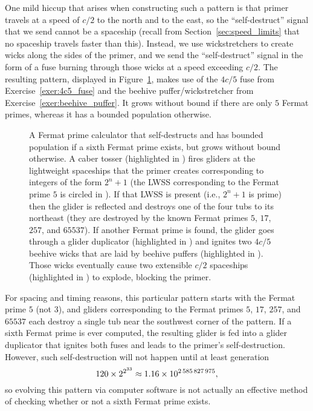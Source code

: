 One mild hiccup that arises when constructing such a pattern is that primer travels at a speed of $c/2$ to the north and to the east, so the ``self-destruct'' signal that we send cannot be a spaceship (recall from Section~\ref{sec:speed_limits} that no spaceship travels faster than this). Instead, we use wickstretchers to create wicks along the sides of the primer, and we send the ``self-destruct'' signal in the form of a fuse burning through those wicks at a speed exceeding $c/2$. The resulting pattern, displayed in Figure~\ref{fig:fermat_primer}, makes use of the $4c/5$ fuse from Exercise~\ref{exer:4c5_fuse} and the beehive puffer/wickstretcher from Exercise~\ref{exer:beehive_puffer}. It grows without bound if there are only $5$ Fermat primes, whereas it has a bounded population otherwise.

\begin{figure}[!htbp]
	\centering
	\caption{A Fermat prime calculator that self-destructs and has bounded population if a sixth Fermat prime exists, but grows without bound otherwise. A caber tosser (highlighted in ) fires gliders at the lightweight spaceships that the primer creates corresponding to integers of the form $2^n+1$ (the LWSS corresponding to the Fermat prime $5$ is circled in ). If that LWSS is present (i.e., $2^n+1$ is prime) then the glider is reflected and destroys one of the four tubs to its northeast (they are destroyed by the known Fermat primes $5$, $17$, $257$, and $65537$). If another Fermat prime is found, the glider goes through a glider duplicator (highlighted in ) and ignites two $4c/5$ beehive wicks that are laid by beehive puffers (highlighted in ). Those wicks eventually cause two extensible $c/2$ spaceships (highlighted in ) to explode, blocking the primer.}\label{fig:fermat_primer}
\end{figure}

For spacing and timing reasons, this particular pattern starts with the Fermat prime $5$ (not $3$), and gliders corresponding to the Fermat primes $5$, $17$, $257$, and $65537$ each destroy a single tub near the southwest corner of the pattern. If a sixth Fermat prime is ever computed, the resulting glider is fed into a glider duplicator that ignites both fuses and leads to the primer's self-destruction. However, such self-destruction will not happen until at least generation
\[
120 \times 2^{2^{33}} \approx 1.16 \times 10^{2{\,}585{\,}827{\,}975},
\]
so evolving this pattern via computer software is  not actually an effective method of checking whether or not a sixth Fermat prime exists.

